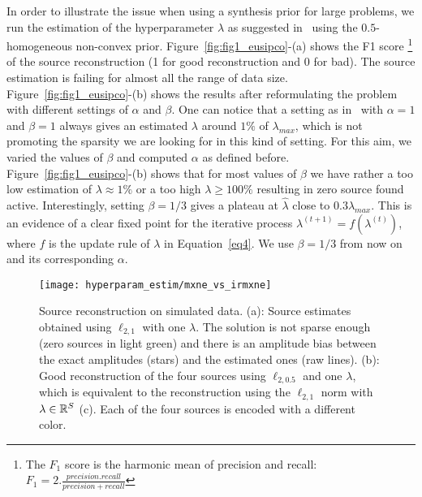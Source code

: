 In order to illustrate the issue when using a synthesis prior for large problems, we run the estimation of the hyperparameter $\lambda$ as suggested in~\cite{Figueiredo} using the $0.5$-homogeneous non-convex prior. Figure~\ref{fig:fig1_eusipco}-(a) shows the F1 score \footnote{The $F_1$ score is the harmonic mean of precision and recall: $F_1=2.\frac{precision . recall}{precision + recall}$} of the source reconstruction (1 for good reconstruction and 0 for bad). The source estimation is failing for almost all the range of data size. Figure~\ref{fig:fig1_eusipco}-(b) shows the results after reformulating the problem with different settings of $\alpha$ and $\beta$. One can notice that a setting as in~\cite{Figueiredo} with $\alpha=1$ and $\beta=1$ always gives an estimated $\lambda$ around $1\%$ of $\lambda_{max}$, which is not promoting the sparsity we are looking for in this kind of setting. For this aim, we varied the values of $\beta$ and computed $\alpha$ as defined before. Figure~\ref{fig:fig1_eusipco}-(b) shows that for most values of $\beta$ we have rather a too low estimation of $\lambda\approx 1\%$ or a too high $\lambda\geq 100\%$ resulting in zero source found active. Interestingly, setting $\beta=1/3$ gives a plateau at $\hat{\lambda}$ close to $0.3\lambda_{max}$. This is an evidence of a clear fixed point for the iterative process $\lambda^{(t+1)}=f(\lambda^{(t)})$, where $f$ is the update rule of $\lambda$ in Equation~\eqref{eq4}. We use $\beta=1/3$ from now on and its corresponding $\alpha$.

\begin{figure}[h!]
	\texttt{[image: hyperparam\_estim/mxne\_vs\_irmxne]}
    \caption{Source reconstruction on simulated data. (a): Source estimates obtained using $\ell_{2,1}$ with one $\lambda$. The solution is not sparse enough (zero sources in light green) and there is an amplitude bias between the exact amplitudes (stars) and the estimated ones (raw lines). (b): Good reconstruction of the four sources using $\ell_{2,0.5}$ and one $\lambda$, which is equivalent to the reconstruction using the $\ell_{2,1}$ norm with $\lambda\in\mathbb{R}^S$ (c). Each of the four sources is encoded with a different color.
    }
    \label{fig:mxne_vs_irmxne}
\end{figure}

